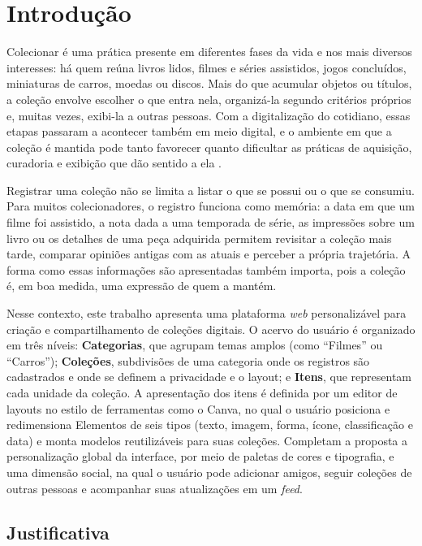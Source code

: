 \chapter{Introdução}
\label{cap:01}

Colecionar é uma prática presente em diferentes fases da vida e nos mais diversos interesses: há quem reúna livros lidos, filmes e séries assistidos, jogos concluídos, miniaturas de carros, moedas ou discos. Mais do que acumular objetos ou títulos, a coleção envolve escolher o que entra nela, organizá-la segundo critérios próprios e, muitas vezes, exibi-la a outras pessoas. Com a digitalização do cotidiano, essas etapas passaram a acontecer também em meio digital, e o ambiente em que a coleção é mantida pode tanto favorecer quanto dificultar as práticas de aquisição, curadoria e exibição que dão sentido a ela \cite{Watkins2015}.

Registrar uma coleção não se limita a listar o que se possui ou o que se consumiu. Para muitos colecionadores, o registro funciona como memória: a data em que um filme foi assistido, a nota dada a uma temporada de série, as impressões sobre um livro ou os detalhes de uma peça adquirida permitem revisitar a coleção mais tarde, comparar opiniões antigas com as atuais e perceber a própria trajetória. A forma como essas informações são apresentadas também importa, pois a coleção é, em boa medida, uma expressão de quem a mantém.

Nesse contexto, este trabalho apresenta uma plataforma \textit{web} personalizável para criação e compartilhamento de coleções digitais. O acervo do usuário é organizado em três níveis: \textbf{Categorias}, que agrupam temas amplos (como ``Filmes'' ou ``Carros''); \textbf{Coleções}, subdivisões de uma categoria onde os registros são cadastrados e onde se definem a privacidade e o layout; e \textbf{Itens}, que representam cada unidade da coleção. A apresentação dos itens é definida por um editor de layouts no estilo de ferramentas como o Canva, no qual o usuário posiciona e redimensiona Elementos de seis tipos (texto, imagem, forma, ícone, classificação e data) e monta modelos reutilizáveis para suas coleções. Completam a proposta a personalização global da interface, por meio de paletas de cores e tipografia, e uma dimensão social, na qual o usuário pode adicionar amigos, seguir coleções de outras pessoas e acompanhar suas atualizações em um \textit{feed}.

\section{Justificativa}


